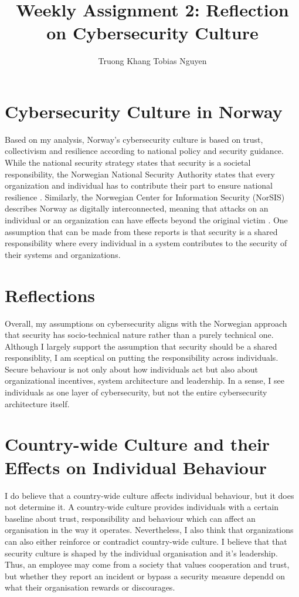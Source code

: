 \documentclass[12pt]{article}
\title{Weekly Assignment 2: Reflection on Cybersecurity Culture}
\author{Truong Khang Tobias Nguyen}
\date{}
\begin{document}
\maketitle

\section{Cybersecurity Culture in Norway}

Based on my analysis, Norway's cybersecurity culture is based on trust, collectivism and resilience according to national policy and security guidance.
\newline
While the national security strategy states that security is a societal responsibility, the Norwegian National Security Authority states that every organization and individual has to contribute their part to ensure national resilience \cite{natsecstrat, nsm}. 
\newline
Similarly, the Norwegian Center for Information Security (NorSIS) describes Norway as digitally interconnected, meaning that attacks on an individual or an organization can have effects beyond the original victim \cite{norsis}. 
\newline
One assumption that can be made from these reports is that security is a shared responsibility where every individual in a system contributes to the security of their systems and organizations.

\section{Reflections}
Overall, my assumptions on cybersecurity aligns with the Norwegian approach that security has socio-technical nature rather than a purely technical one.
\newline
Although I largely support the assumption that security should be a shared responsiblity, I am sceptical on putting the responsibility across individuals. Secure behaviour is not only about how individuals act but also about organizational incentives, system architecture and leadership. In a sense, I see individuals as one layer of cybersecurity, but not the entire cybersecurity architecture itself.

\section{Country-wide Culture and their Effects on Individual Behaviour}
I do believe that a country-wide culture affects individual behaviour, but it does not determine it. A country-wide culture provides individuals with a certain baseline about trust, responsibility and behaviour which can affect an organisation in the way it operates. 
\newline
Nevertheless, I also think that organizations can also either reinforce or contradict country-wide culture. I believe that that security culture is shaped by the individual organisation and it's leadership. 
\newline
Thus, an employee may come from a society that values cooperation and trust, but whether they report an incident or bypass a security measure dependd on what their organisation rewards or discourages.



\end{document}
